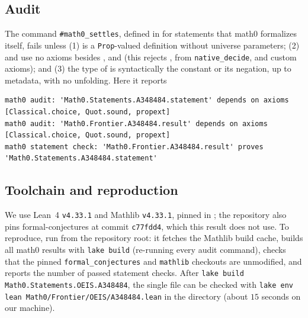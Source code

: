 \documentclass[11pt]{amsart}
\theoremstyle{plain}
\theoremstyle{definition}
\begin{document}
\subsection*{Audit}
The command \texttt{\#math0\_settles}, defined in  for statements that math0 formalizes itself, fails unless (1)  is a \texttt{Prop}-valued definition without universe parameters; (2)  and  use no axioms besides ,  and  (this rejects ,  from \texttt{native\_decide}, and custom axioms); and (3) the type of  is syntactically the constant  or its negation, up to metadata, with no unfolding. Here it reports
\begin{lstlisting}[basicstyle=\ttfamily\scriptsize]
math0 audit: 'Math0.Statements.A348484.statement' depends on axioms [Classical.choice, Quot.sound, propext]
math0 audit: 'Math0.Frontier.A348484.result' depends on axioms [Classical.choice, Quot.sound, propext]
math0 statement check: 'Math0.Frontier.A348484.result' proves 'Math0.Statements.A348484.statement'
\end{lstlisting}

\subsection*{Toolchain and reproduction}
We use Lean~4 \cite{Lean4} \texttt{v4.33.1} and Mathlib \cite{Mathlib} \texttt{v4.33.1}, pinned in ; the repository also pins formal-conjectures \cite{FC} at commit \texttt{c77fdd4}, which this result does not use.
To reproduce, run  from the repository root: it fetches the Mathlib build cache, builds all math0 results with \texttt{lake build} (re-running every audit command), checks that the pinned \texttt{formal\_conjectures} and \texttt{mathlib} checkouts are unmodified, and reports the number of passed statement checks.
After \texttt{lake build Math0.Statements.OEIS.A348484}, the single file can be checked with \texttt{lake env lean Math0/Frontier/OEIS/A348484.lean} in the directory  (about $15$ seconds on our machine).
\end{document}
